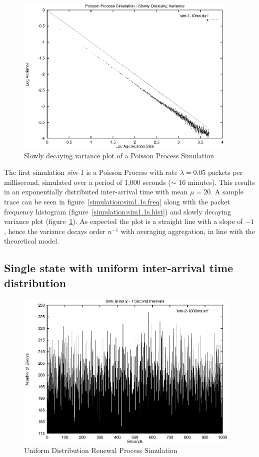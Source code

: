 \begin{figure}
\includegraphics[height=3in]{pics/sim-1-10ms-sta.eps}
\caption{Slowly decaying variance plot of a Poisson Process Simulation}
\label{simulation:sim1.10ms.sta}
\end{figure}

The first simulation {\em sim-1} is a Poisson Process with rate
$\lambda = 0.05$ packets per millisecond, simulated over a period of
1,000 seconds ($\sim$ 16 minutes).  This results in an exponentially
distributed inter-arrival time with mean $\mu = 20$.  A sample trace
can be seen in figure~\ref{simulation:sim1.1s.freq} along with the
packet frequency histogram (figure~\ref{simulation:sim1.1s.hist}) and
slowly decaying variance plot
(figure~\ref{simulation:sim1.10ms.sta}).  As expected the plot is a
straight line with a slope of $-1$, hence the variance decays order
$n^{-1}$ with averaging aggregation, in line with the theoretical
model.

\subsection{Single state with uniform inter-arrival time distribution}

\begin{figure}
\includegraphics[height=3in]{pics/sim-2-1s-freq.eps}
\caption{Uniform Distribution Renewal Process Simulation}
\label{simulation:sim2.1s.freq}
\end{figure}

